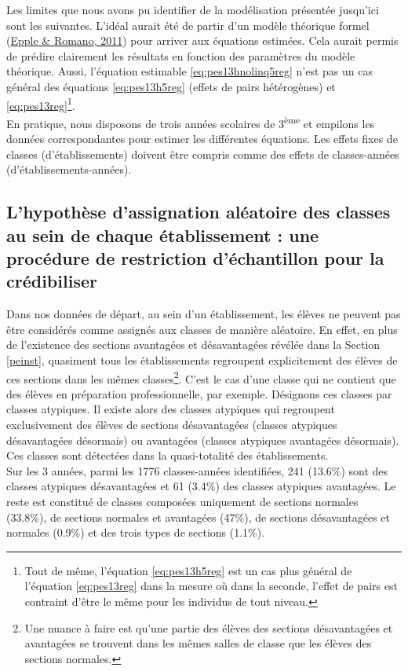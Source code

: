 \documentclass[
]{book}
\begin{document}
\quad Les limites que nous avons pu identifier de la modélisation présentée jusqu'ici sont les suivantes. L'idéal aurait été de partir d'un modèle théorique formel (\protect\hyperlink{ref-EPP:ROM:11}{Epple \& Romano, 2011}) pour arriver aux équations estimées. Cela aurait permis de prédire clairement les résultats en fonction des paramètres du modèle théorique. Aussi, l'équation estimable \eqref{eq:pes13hnolinq5reg} n'est pas un cas général des équations \eqref{eq:pes13h5reg} (effets de pairs hétérogènes) et \eqref{eq:pes13reg}\footnote{Tout de même, l'équation \eqref{eq:pes13h5reg} est un cas plus général de l'équation \eqref{eq:pes13reg} dans la mesure où dans la seconde, l'effet de pairs est contraint d'être le même pour les individus de tout niveau.}.\\

\quad En pratique, nous disposons de trois années scolaires de 3\textsuperscript{ème} et empilons les données correspondantes pour estimer les différentes équations. Les effets fixes de classes (d'établissements) doivent être compris comme des effets de classes-années (d'établissements-années).

\hypertarget{pemethodsrestr}{%
\subsection{L'hypothèse d'assignation aléatoire des classes au sein de chaque établissement : une procédure de restriction d'échantillon pour la crédibiliser}\label{pemethodsrestr}}

Dans nos données de départ, au sein d'un établissement, les élèves ne peuvent pas être considérés comme assignés aux classes de manière aléatoire. En effet, en plus de l'existence des sections avantagées et désavantagées révélée dans la Section \ref{peinst}, quasiment tous les établissements regroupent explicitement des élèves de ces sections dans les mêmes classes\footnote{Une nuance à faire est qu'une partie des élèves des sections désavantagées et avantagées se trouvent dans les mêmes salles de classe que les élèves des sections normales.}. C'est le cas d'une classe qui ne contient que des élèves en préparation professionnelle, par exemple. Désignons ces classes par classes atypiques. Il existe alors des classes atypiques qui regroupent exclusivement des élèves de sections désavantagées (classes atypiques désavantagées désormais) ou avantagées (classes atypiques avantagées désormais). Ces classes sont détectées dans la quasi-totalité des établissements. \\
\quad Sur les 3 années, parmi les 1776 classes-années identifiées, 241 (13.6\%) sont des classes atypiques désavantagées et 61 (3.4\%) des classes atypiques avantagées. Le reste est constitué de classes composées uniquement de sections normales (33.8\%), de sections normales et avantagées (47\%), de sections désavantagées et normales (0.9\%) et des trois types de sections (1.1\%).
\end{document}
